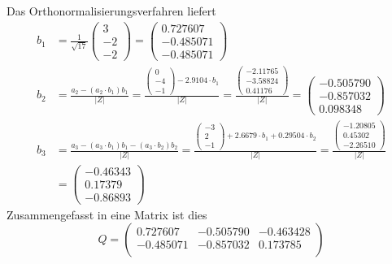 \begin{loesung}
\begin{teilaufgaben}
\item
Das Orthonormalisierungsverfahren liefert 
\begin{align*}
b_1
&=
\frac1{\sqrt{17}} \begin{pmatrix}3\\-2\\-2\end{pmatrix}
=
\begin{pmatrix}
   0.727607\\
  -0.485071\\
  -0.485071
\end{pmatrix}
\\
b_2
&=
\frac{a_2-(a_2\cdot b_1)b_1}{|Z|}
=
\frac{
\begin{pmatrix}0\\-4\\-1\end{pmatrix} - 2.9104\cdot b_1
}{|Z|}
=
\frac{\begin{pmatrix}
  -2.11765\\
  -3.58824\\
   0.41176
\end{pmatrix}}{|Z|}
=
\begin{pmatrix}
  -0.505790\\
  -0.857032\\
   0.098348
\end{pmatrix}
\\
b_3
&=
\frac{a_3-(a_3\cdot b_1)b_1-(a_3\cdot b_2)b_2}{|Z|}
=
\frac{\begin{pmatrix}-3\\2\\-1\end{pmatrix} +2.6679\cdot b_1 +0.29504\cdot b_2}{|Z|}
=
\frac{\begin{pmatrix}
  -1.20805\\
   0.45302\\
  -2.26510
\end{pmatrix}}{|Z|}
\\
&=
\begin{pmatrix}
  -0.46343\\
   0.17379\\
  -0.86893
\end{pmatrix}
\end{align*}
Zusammengefasst in eine Matrix ist dies 
\[
Q=\begin{pmatrix}
   0.727607& -0.505790& -0.463428\\
  -0.485071& -0.857032&  0.173785\\

\end{pmatrix}\]
\end{teilaufgaben}
\end{loesung}

